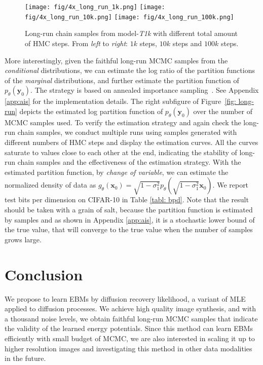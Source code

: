 \documentclass{article} \usepackage{iclr2021_conference,times}
\def\Figref#1{Figure~\ref{#1}}
\def\rvx{{\mathbf{x}}}
\def\rvy{{\mathbf{y}}}
\begin{document}
\begin{wrapfigure}{r}{0.38\linewidth}
\centering
\texttt{[image: fig/4x\_long\_run\_1k.png]}
\texttt{[image: fig/4x\_long\_run\_10k.png]}
\texttt{[image: fig/4x\_long\_run\_100k.png]}
\caption{Long-run chain samples from model-{\em T1k} with different total amount of HMC steps. From {\em left} to {\em right}: $1k$ steps, $10k$ steps and $100k$ steps.}
\vspace{-.3cm}
\label{fig: long-run-samples}
\end{wrapfigure}
More interestingly, given the faithful long-run MCMC samples from the {\em conditional} distributions, we can estimate the log ratio of the partition functions of the {\em marginal} distributions, and further estimate the partition function of $p_\theta(\rvy_0)$. The strategy is based on annealed importance sampling~\citep{neal2001annealed}. See Appendix \ref{app:ais} for the implementation details. The right subfigure of \Figref{fig: long-run} depicts the estimated log partition function of $p_\theta(\rvy_0)$ over the number of MCMC samples used. To verify the estimation strategy and again check the long-run chain samples, we conduct multiple runs using samples generated with different numbers of HMC steps and display the estimation curves. All the curves saturate to values close to each other at the end, indicating the stability of long-run chain samples and the effectiveness of the estimation strategy. With the estimated partition function, by {\em change of variable}, we can estimate the normalized density of data as $g_\theta(\rvx_0) = \sqrt{1 - \sigma_1^2} p_\theta(\sqrt{1 - \sigma_1^2} \rvx_0)$. We report test bits per dimension on CIFAR-10 in Table \ref{tabl: bpd}. Note that the result should be taken with a grain of salt, because the partition function is estimated by samples and as shown in Appendix \ref{app:ais}, it is a stochastic lower bound of the true value, that will converge to the true value when the number of samples grows large. 

\section{Conclusion} 





We propose to learn EBMs by diffusion recovery likelihood, a variant of MLE applied to diffusion processes. We achieve high quality image synthesis, and with a thousand noise levels, we obtain faithful long-run MCMC samples that indicate the validity of the learned energy potentials. Since this method can learn EBMs efficiently with small budget of MCMC, we are also interested in scaling it up to higher resolution images and investigating this method in other data modalities in the future. 
\end{document}
